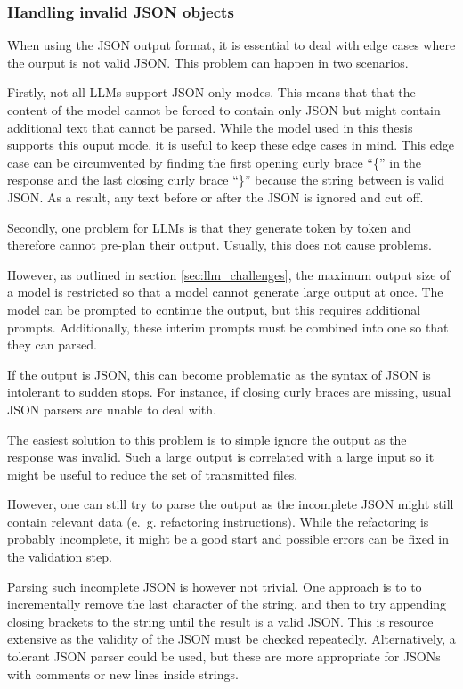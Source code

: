 \subsubsection{Handling invalid \ac{JSON} objects}

When using the \ac{JSON} output format, it is essential to deal with edge cases where the ourput is not valid \ac{JSON}. This problem can happen in two scenarios.

Firstly, not all \acp{LLM} support \ac{JSON}-only modes. This means that that the content of the model cannot be forced to contain only \ac{JSON} but might contain additional text that cannot be parsed. While the model used in this thesis supports this ouput mode, it is useful to keep these edge cases in mind. This edge case can be circumvented by finding the first opening curly brace \enquote{\{} in the response and the last closing curly brace \enquote{\}} because the string between is valid \ac{JSON}. As a result, any text before or after the \ac{JSON} is ignored and cut off. 

Secondly, one problem for \acp{LLM} is that they generate token by token and therefore cannot pre-plan their output. Usually, this does not cause problems. 

However, as outlined in section \ref{sec:llm_challenges}, the maximum output size of a model is restricted so that a model cannot generate large output at once. The model can be prompted to continue the output, but this requires additional prompts. Additionally, these interim prompts must be combined into one so that they can parsed.

If the output is \ac{JSON}, this can become problematic as the syntax of \ac{JSON} is intolerant to sudden stops. For instance, if closing curly braces  are missing, usual \ac{JSON} parsers are unable to deal with. 

The easiest solution to this problem is to simple ignore the output as the response was invalid. Such a large output is correlated with a large input so it might be useful to reduce the set of transmitted files. 

However,  one can still try to parse the output as the incomplete \ac{JSON} might still contain relevant data (e.~g. refactoring instructions). While the refactoring is probably incomplete, it might be a good start and possible errors can be fixed in the validation step.

Parsing such incomplete \ac{JSON} is however not trivial. One approach is to to incrementally remove the last character of the string, and then to try appending closing brackets to the string until the result is a valid \ac{JSON}. This is resource extensive as the validity of the \ac{JSON} must be checked repeatedly. Alternatively, a tolerant \ac{JSON} parser could be used, but these are more appropriate for \acp{JSON} with comments or new lines inside strings. 



